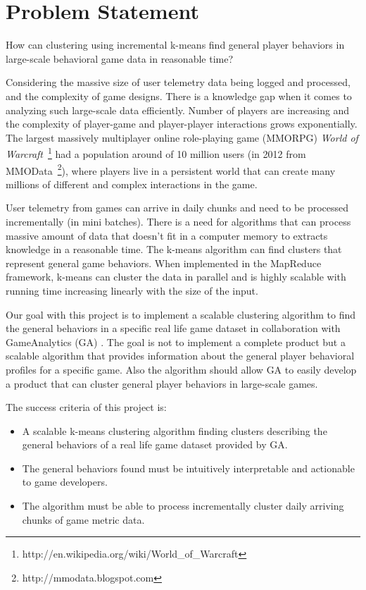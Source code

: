 \section{Problem Statement}

{\addtolength{\leftskip}{5mm} How can clustering using incremental k-means find general player behaviors in large-scale behavioral game data in reasonable time? \par}

Considering the massive size of user telemetry data being logged and processed, and the complexity of game designs. There is a knowledge gap when it comes to analyzing such large-scale data efficiently. Number of players are increasing and the complexity of player-game and player-player interactions grows exponentially. The largest massively multiplayer online role-playing game (MMORPG) \textit{World of Warcraft}~\footnote{http://en.wikipedia.org/wiki/World\_of\_Warcraft} had a population around of 10 million users (in 2012 from MMOData~\footnote{http://mmodata.blogspot.com}), where players live in a persistent world that can create many millions of different and complex interactions in the game. 

User telemetry from games can arrive in daily chunks and need to be processed incrementally (in mini batches). There is a need for algorithms that can process massive amount of data that doesn't fit in a computer memory to extracts knowledge in a reasonable time. The k-means algorithm can find clusters that represent general game behaviors. When implemented in the MapReduce framework, k-means can cluster the data in parallel and is highly scalable with running time increasing linearly with the size of the input. 

Our goal with this project is to implement a scalable clustering algorithm to find the general behaviors in a specific real life game dataset in collaboration with GameAnalytics (GA) \citep{GA2013}. The goal is not to implement a complete product but a scalable algorithm that provides information about the general player behavioral profiles for a specific game. Also the algorithm should allow GA to easily develop a product that can cluster general player behaviors in large-scale games.

The success criteria of this project is:
\begin{itemize}
\item A scalable k-means clustering algorithm finding clusters describing the general behaviors of a real life game dataset provided by GA.
\item The general behaviors found must be intuitively interpretable and actionable to game developers.
\item The algorithm must be able to process incrementally cluster daily arriving chunks of game metric data.
\end{itemize}

